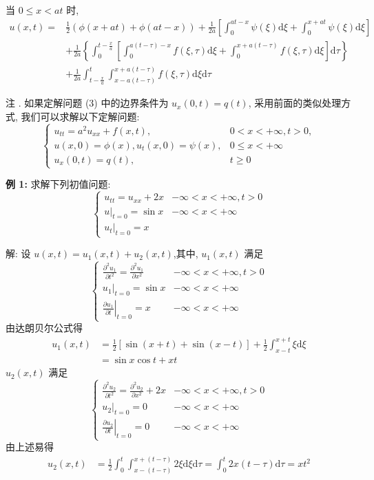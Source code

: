 当 $ 0 \leqslant x<a t $ 时,
$$
\begin{aligned}
u(x, t)= & \frac{1}{2}(\phi(x+a t)+\phi(a t-x))+\frac{1}{2 a}\left[\int_{0}^{a t-x} \psi(\xi) \mathrm{d} \xi+\int_{0}^{x+a t} \psi(\xi) \mathrm{d} \xi\right] \\
& +\frac{1}{2 a}\left\{\int_{0}^{t-\frac{x}{a}}\left[\int_{0}^{a(t-\tau)-x} f(\xi, \tau) \mathrm{d} \xi+\int_{0}^{x+a(t-\tau)} f(\xi, \tau) \mathrm{d} \xi\right] \mathrm{d} \tau\right\} \\
& +\frac{1}{2 a} \int_{t-\frac{x}{a}}^{t} \int_{x-a(t-\tau)}^{x+a(t-\tau)} f(\xi, \tau) \mathrm{d} \xi \mathrm{d} \tau
\end{aligned}
$$

注 . 如果定解问题 (3) 中的边界条件为 $ u_{x}(0, t)=q(t) $, 采用前面的类似处理方式, 我们可以求解以下定解问题:
$$
\left\{\begin{array}{ll}
u_{t t}=a^{2} u_{x x}+f(x, t), & 0<x<+\infty, t>0, \\
u(x, 0)=\phi(x), u_{t}(x, 0)=\psi(x), & 0 \leqslant x<+\infty \\
u_{x}(0, t)=q(t), & t \geqslant 0
\end{array}\right.
$$




\textbf{例 1: }求解下列初值问题:
$$
\left\{\begin{array}{ll}
u_{t t}=u_{x x}+2 x & -\infty<x<+\infty, t>0 \\
\left.u\right|_{t=0}=\sin x & -\infty<x<+\infty \\
\left.u_{t}\right|_{t=0}=x &
\end{array}\right.
$$

解: 设 $ u(x, t)=u_{1}(x, t)+u_{2}(x, t) $,其中, $ u_{1}(x, t) $ 满足
$$
\left\{\begin{array}{ll}
\frac{\partial^{2} u_{1}}{\partial t^{2}}=\frac{\partial^{2} u_{1}}{\partial x^{2}} & -\infty<x<+\infty, t>0 \\
\left.u_{1}\right|_{t=0}=\sin x & -\infty<x<+\infty \\
\left.\frac{\partial u_{1}}{\partial t}\right|_{t=0}=x & -\infty<x<+\infty
\end{array}\right.
$$
由达朗贝尔公式得
$$
\begin{aligned}
u_{1}(x, t) & =\frac{1}{2}[\sin (x+t)+\sin (x-t)]+\frac{1}{2} \int_{x-t}^{x+t} \xi \mathrm{d} \xi \\
& =\sin x \cos t+x t
\end{aligned}
$$
$ u_{2}(x, t) $ 满足
$$
\left\{\begin{array}{ll}
\frac{\partial^{2} u_{2}}{\partial t^{2}}=\frac{\partial^{2} u_{2}}{\partial x^{2}}+2 x & -\infty<x<+\infty, t>0 \\
\left.u_{2}\right|_{t=0}=0 & -\infty<x<+\infty \\
\left.\frac{\partial u_{2}}{\partial t}\right|_{t=0}=0 & -\infty<x<+\infty
\end{array}\right.
$$
由上述易得
$$
\begin{aligned}
u_{2}(x, t) & =\frac{1}{2} \int_{0}^{t} \int_{x-(t-\tau)}^{x+(t-\tau)} 2 \xi \mathrm{d} \xi \mathrm{d} \tau  =\int_{0}^{t} 2 x(t-\tau) \mathrm{d} \tau=x t^{2}
\end{aligned}
$$

